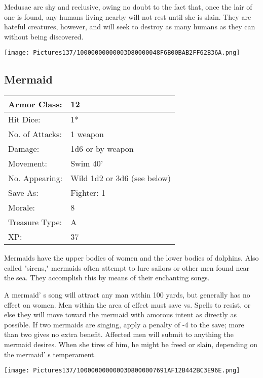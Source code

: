 \documentclass[a4paper,twoside,openany,10pt]{book}
\begin{document}
\begin{multicols}{2}
Medusae are shy and reclusive, owing no doubt to the fact that, once the lair of one is found, any humans living nearby will not rest until she is slain. They are hateful creatures, however, and will seek to destroy as many humans as they can without being discovered.

\begin{center} \texttt{[image: Pictures137/10000000000003D80000048F6B00BAB2FF62B36A.png]} \end{center}


\subsection*{Mermaid}\label{mermaid}

\begin{tabularx}{0.50\textwidth}{@{}lX@{}}
Armor Class: & 12 \\\hline
Hit Dice: & 1* \\\hline
No. of Attacks: & 1 weapon \\\hline
Damage: & 1d6 or by weapon \\\hline
Movement: & Swim 40' \\\hline
No. Appearing: & Wild 1d2 or 3d6 (see below) \\\hline
Save As: & Fighter: 1 \\\hline
Morale: & 8 \\\hline
Treasure Type: & A \\\hline
XP: & 37 \\\hline
\end{tabularx}\medskip

Mermaids have the upper bodies of women and the lower bodies of dolphins. Also called "sirens," mermaids often attempt to lure sailors or other men found near the sea. They accomplish this by means of their enchanting songs.

A mermaid' s song will attract any man within 100 yards, but generally has no effect on women. Men within the area of effect must save vs. Spells to resist, or else they will move toward the mermaid with amorous intent as directly as possible. If two mermaids are singing, apply a penalty of -4 to the save; more than two gives no extra benefit. Affected men will submit to anything the mermaid desires. When she tires of him, he might be freed or slain, depending on the mermaid' s temperament.


\begin{center} \texttt{[image: Pictures137/10000000000003D8000007691AF12B442BC3E96E.png]} \end{center}


\end{multicols}
\end{document}
